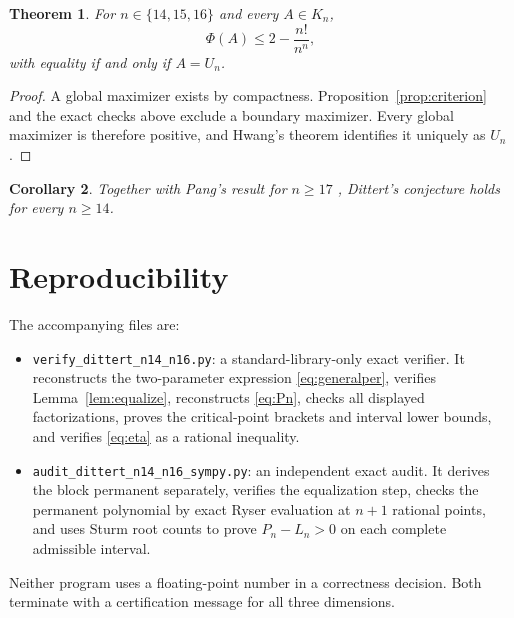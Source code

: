 \documentclass[11pt]{article}
\newtheorem{theorem}{Theorem}[section]
\newtheorem{corollary}[theorem]{Corollary}
\theoremstyle{remark}
\begin{document}
\begin{theorem}\label{thm:main}
For $n\in\{14,15,16\}$ and every $A\in K_n$,
\[
 \Phi(A)\le 2-\frac{n!}{n^n},
\]
with equality if and only if $A=U_n$.
\end{theorem}

\begin{proof}
A global maximizer exists by compactness.  Proposition~\ref{prop:criterion}
and the exact checks above exclude a boundary maximizer.  Every global
maximizer is therefore positive, and Hwang's theorem identifies it uniquely
as $U_n$.
\end{proof}

\begin{corollary}
Together with Pang's result for $n\ge17$ \cite{Pang2026}, Dittert's conjecture
holds for every $n\ge14$.
\end{corollary}

\section{Reproducibility}

The accompanying files are:
\begin{itemize}
 \item \texttt{verify\_dittert\_n14\_n16.py}: a standard-library-only exact
 verifier.  It reconstructs the two-parameter expression
 \eqref{eq:generalper}, verifies Lemma~\ref{lem:equalize}, reconstructs
 \eqref{eq:Pn}, checks all displayed factorizations, proves the critical-point
 brackets and interval lower bounds, and verifies \eqref{eq:eta} as a
 rational inequality.
 \item \texttt{audit\_dittert\_n14\_n16\_sympy.py}: an independent exact audit.
 It derives the block permanent separately, verifies the equalization step,
 checks the permanent polynomial by exact Ryser evaluation at $n+1$ rational
 points, and uses Sturm root counts to prove $P_n-L_n>0$ on each complete
 admissible interval.
\end{itemize}
Neither program uses a floating-point number in a correctness decision.
Both terminate with a certification message for all three dimensions.
\end{document}
